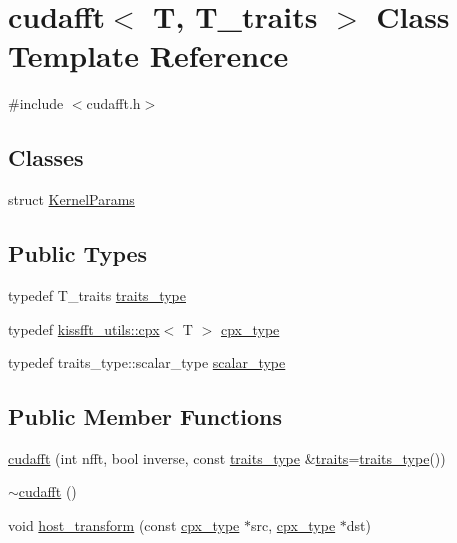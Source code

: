 \hypertarget{classcudafft}{}\section{cudafft$<$ T, T\+\_\+traits $>$ Class Template Reference}
\label{classcudafft}


{\ttfamily \#include $<$cudafft.\+h$>$}

\subsection*{Classes}
\begin{DoxyCompactItemize}
\item 
struct \hyperlink{structcudafft_1_1_kernel_params}{Kernel\+Params}
\end{DoxyCompactItemize}
\subsection*{Public Types}
\begin{DoxyCompactItemize}
\item 
typedef T\+\_\+traits \hyperlink{classcudafft_a6f6713e7fe0f79baa2fca080c37e7f4e}{traits\+\_\+type}
\item 
typedef \hyperlink{structkissfft__utils_1_1cpx}{kissfft\+\_\+utils\+::cpx}$<$ T $>$ \hyperlink{classcudafft_a6b6e4901630f197baf4cf7f165543ece}{cpx\+\_\+type}
\item 
typedef traits\+\_\+type\+::scalar\+\_\+type \hyperlink{classcudafft_ac9c43c335102bda3102243f24de11ce6}{scalar\+\_\+type}
\end{DoxyCompactItemize}
\subsection*{Public Member Functions}
\begin{DoxyCompactItemize}
\item 
\hyperlink{classcudafft_a3130fb5bc9d013039b7a8bdbeee42db1}{cudafft} (int nfft, bool inverse, const \hyperlink{classcudafft_a6f6713e7fe0f79baa2fca080c37e7f4e}{traits\+\_\+type} \&\hyperlink{classcudafft_a8a9bd28623cdece7c8c5fa89917ad7a4}{traits}=\hyperlink{classcudafft_a6f6713e7fe0f79baa2fca080c37e7f4e}{traits\+\_\+type}())
\item 
\hyperlink{classcudafft_ac2b76855600de508af5bca5a8ba21af7}{$\sim$cudafft} ()
\item 
void \hyperlink{classcudafft_addacb7587678b7137e3d573984522dc0}{host\+\_\+transform} (const \hyperlink{classcudafft_a6b6e4901630f197baf4cf7f165543ece}{cpx\+\_\+type} $\ast$src, \hyperlink{classcudafft_a6b6e4901630f197baf4cf7f165543ece}{cpx\+\_\+type} $\ast$dst)
\end{DoxyCompactItemize}
